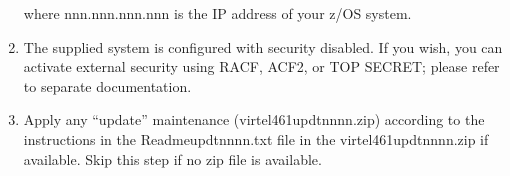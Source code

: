 \documentclass[letterpaper,10pt,english]{sphinxmanual}
\begin{document}
\begin{enumerate}
\sphinxAtStartPar
{}

\sphinxAtStartPar
where nnn.nnn.nnn.nnn is the IP address of your z/OS system.

\item {} 
\sphinxAtStartPar
The supplied system is configured with security disabled. If you wish, you can activate external security using RACF, ACF2, or TOP SECRET; please refer to separate documentation.

\item {} 
\sphinxAtStartPar
Apply any “update” maintenance (virtel461updtnnnn.zip) according to the instructions in the Readme\sphinxhyphen{}updtnnnn.txt file in the virtel461updtnnnn.zip if available. Skip this step if no zip file is available.

\end{enumerate}
\end{document}
